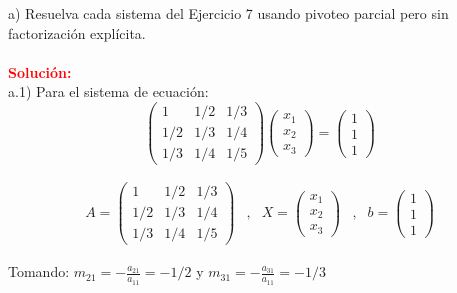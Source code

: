 a) Resuelva cada sistema del Ejercicio 7 usando pivoteo parcial pero sin factorización explícita.
\\
\\
\noindent \textcolor{red}{\bf Solución:}\\    
a.1) Para el sistema de ecuación:\\
\begin{equation*}
    \begin{pmatrix}
        1 & 1/2 & 1/3 \\
        1/2 & 1/3 & 1/4 \\
        1/3 & 1/4 & 1/5
    \end{pmatrix}
    \begin{pmatrix}
        x_1 \\
        x_2 \\
        x_3
    \end{pmatrix}    
    =    
    \begin{pmatrix}
        1 \\
        1 \\
        1
    \end{pmatrix}
\end{equation*}

\begin{equation*}
    \begin{matrix}
        A=\begin{pmatrix}
            1 & 1/2 & 1/3 \\
            1/2 & 1/3 & 1/4 \\
            1/3 & 1/4 & 1/5
        \end{pmatrix}
        & , &
        X=\begin{pmatrix}
            x_1 \\
            x_2 \\
            x_3
        \end{pmatrix} 
        & , &
        b=\begin{pmatrix}
            1 \\
            1 \\
            1
        \end{pmatrix}
    \end{matrix}
\end{equation*}

Tomando: $m_{21}=-\frac{a_{21}}{a_{11}}=-1/2$ y $m_{31}=-\frac{a_{31}}{a_{11}}=-1/3$


